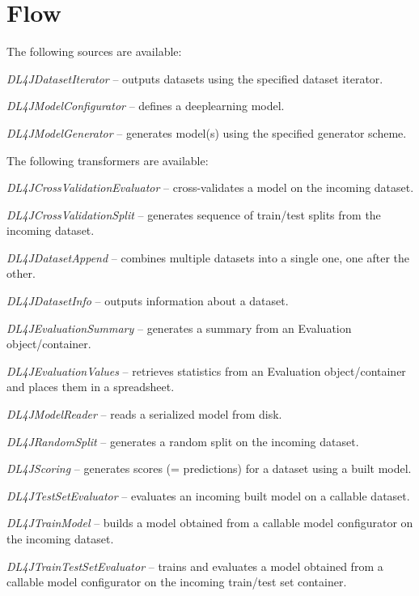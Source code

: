 \documentclass[a4paper]{book}
\begin{document}
\chapter{Flow}

The following sources are available:
\begin{tight_itemize}
  \item \textit{DL4JDatasetIterator} -- outputs datasets using the specified
  dataset iterator.
  \item \textit{DL4JModelConfigurator} -- defines a deeplearning model.
  \item \textit{DL4JModelGenerator} -- generates model(s) using the specified
  generator scheme.
\end{tight_itemize}

The following transformers are available:
\begin{tight_itemize}
  \item \textit{DL4JCrossValidationEvaluator} -- cross-validates a model
  on the incoming dataset.
  \item \textit{DL4JCrossValidationSplit} -- generates sequence of train/test
  splits from the incoming dataset.
  \item \textit{DL4JDatasetAppend} -- combines multiple datasets into a single one,
  one after the other.
  \item \textit{DL4JDatasetInfo} -- outputs information about a dataset.
  \item \textit{DL4JEvaluationSummary} -- generates a summary from an Evaluation
  object/container.
  \item \textit{DL4JEvaluationValues} -- retrieves statistics from an Evaluation
  object/container and places them in a spreadsheet.
  \item \textit{DL4JModelReader} -- reads a serialized model from disk.
  \item \textit{DL4JRandomSplit} -- generates a random split on the incoming dataset.
  \item \textit{DL4JScoring} -- generates scores (= predictions) for a dataset
  using a built model.
  \item \textit{DL4JTestSetEvaluator} -- evaluates an incoming built model on a
  callable dataset.
  \item \textit{DL4JTrainModel} -- builds a model obtained from a callable model
  configurator on the incoming dataset.
  \item \textit{DL4JTrainTestSetEvaluator} -- trains and evaluates a model obtained
  from a callable model configurator on the incoming train/test set container.
\end{tight_itemize}
\end{document}
